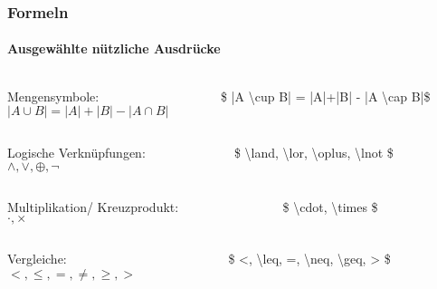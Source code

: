 \begin{frame}
\frametitle{Formeln}
\framesubtitle{Ausgewählte nützliche Ausdrücke}
\begin{columns}
\begin{column}{.4\textwidth}
Mengensymbole:\\
$ |A \cup B| = |A|+|B| - |A \cap B| $
\end{column}
\begin{column}{.6\textwidth}
{\ttfamily \color{unibayellowI} \$\color{black} |A \color{nounibaredI}\textbackslash cup \color{black} B| = |A|+|B| - |A \color{nounibaredI}\textbackslash cap \color{black} B|\color{unibayellowI}\$ }
\end{column}
\end{columns}
\bigskip
\begin{columns}
\begin{column}{.4\textwidth}
Logische Verknüpfungen:\\
$ \land, \lor, \oplus, \lnot $
\end{column}
\begin{column}{.6\textwidth}
{\ttfamily \color{unibayellowI} \$ \color{nounibaredI}\textbackslash land\color{black}, \color{nounibaredI}\textbackslash lor\color{black}, \color{nounibaredI}\textbackslash oplus\color{black}, \color{nounibaredI}\textbackslash lnot \color{unibayellowI} \$ }
\end{column}
\end{columns}
\bigskip
\begin{columns}
\begin{column}{.4\textwidth}
Multiplikation/ Kreuzprodukt:\\
$ \cdot, \times $
\end{column}
\begin{column}{.6\textwidth}
{\ttfamily \color{unibayellowI} \$ \color{nounibaredI}\textbackslash cdot\color{black}, \color{nounibaredI}\textbackslash times \color{unibayellowI} \$ }
\end{column}
\end{columns}

\bigskip
\begin{columns}
\begin{column}{.4\textwidth}
Vergleiche:\\
$ <, \leq, =, \neq, \geq, > $
\end{column}
\begin{column}{.6\textwidth}
{\ttfamily \color{unibayellowI} \$ \color{black} <, \color{nounibaredI}\textbackslash leq\color{black}, =,  \color{nounibaredI}\textbackslash neq\color{black}, \color{nounibaredI}\textbackslash geq\color{black}, > \color{unibayellowI} \$ }
\end{column}
\end{columns}


\end{frame}

